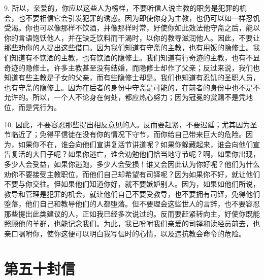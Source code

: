 9. 所以，亲爱的，你应以这些人为榜样，不要听信人说主教的职务是犯罪的机会，也不要相信它会引发犯罪的诱惑。因为即使你身为主教，也仍可以如一样忍饥受渴。你也可以像那样不饮酒，并像那样时常，好使你如此效法他守斋之后，能以你的言语饱饫他人，并在缺乏饮料而干渴时，以你的教导滋润他人。因此，不要让那些劝你的人提出这些借口。因为我们知道有守斋的主教，也有用饭的隐修士。我们知道有不饮酒的主教，也有饮酒的隐修士。我们知道有行奇迹的主教，也有不显奇迹的隐修士。许多主教甚至没有结婚，而隐修士却作了父亲；反过来说，我们也知道有些主教是子女的父亲，而有些隐修士却是。我们也知道有忍饥的圣职人员，也有守斋的隐修士。因为在后者的身份中守斋是可能的，在前者的身份中也不是不允许的。所以，一个人不论身在何处，都应热心努力；因为冠冕的赏赐不是凭地位，而是凭行为。\par

10. 因此，不要容忍那些提出相反意见的人。反而要赶紧，不要迟延；尤其因为圣节临近了；免得平信徒在没有你的情况下守节，而你给自己带来巨大的危险。因为，如果你不在，谁会向他们宣讲复活节讲道呢？如果你躲藏起来，谁会向他们宣告复活的大日子呢？如果你逃亡，谁会劝勉他们恰当地守节呢？啊，如果你出现，多少人会受益，如果你逃跑，多少人会受损！谁又会因此认为你好呢？他们为什么劝你不要接受主教职位，而他们自己却希望有司铎呢？因为如果你不好，就让他们不要与你交往。但如果他们知道你好，就不要嫉妒别人。因为，如果如他们所说，教导和管理是犯罪的机会，就让他们自己不要受教导，也不要拥有司铎，免得他们堕落，他们自己和教导他们的人都堕落。但不要理会这些世人的言辞，也不要容忍那些提出此类建议的人，正如我已经多次说过的。反而要赶紧转向主，好使你既能照顾他的羊群，也能记念我们。为此，我已吩咐我们亲爱的司铎和读经员前去，也亲口嘱咐你，使你这便可以明白我写信时的心情，以及违抗教会命令的危险。\par



\section{第五十封信}

\par

